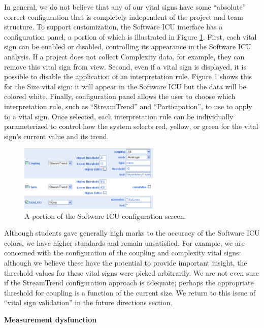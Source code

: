 \documentclass{acm_proc_article-sp}
\begin{document}
In general, we do not believe that any of our vital signs have some
``absolute'' correct configuration that is completely independent of the project and
team structure.  To support customization, the Software ICU interface has a
configuration panel, a portion of which is illustrated in Figure
\ref{fig:configuration}.  First, each vital sign can be enabled or
disabled, controlling its appearance in the Software ICU analysis. If a
project does not collect Complexity data, for example, they can remove this
vital sign from view.  Second, even if a vital sign is displayed, it is
possible to disable the application of an interpretation rule.  Figure
\ref{fig:configuration} shows this for the Size vital sign: it will appear
in the Software ICU but the data will be colored white.  Finally,
configuration panel allows the user to choose which interpretation rule,
such as ``StreamTrend'' and ``Participation'', to use to apply to a vital
sign. Once selected, each interpretation rule can be individually
parameterized to control how the system selects red, yellow, or green for
the vital sign's current value and its trend.

\begin{figure}[ht]
  \center
  \includegraphics[width=0.6\textwidth]{configuration.eps}
  \caption{A portion of the Software ICU configuration screen.}
  \label{fig:configuration}
\end{figure} 

Although students gave generally high marks to the accuracy of the Software
ICU colors, we have higher standards and remain unsatisfied.  For example,
we are concerned with the configuration of the coupling and complexity
vital signs: although we believe these have the potential to provide
important insight, the threshold values for these vital signs were picked
arbitrarily.  We are not even sure if the StreamTrend configuration
approach is adequate; perhaps the appropriate threshold for coupling is a
function of the current size. We return to this issue of ``vital sign validation'' in the
future directions section.

{\bf Measurement dysfunction}
\end{document}
